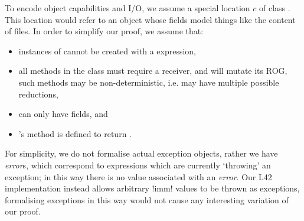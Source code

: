 \noindent To encode object capabilities and I/O, we assume a special location  $c$ of class \Q@Cap@. This location would refer to an object whose fields model things like the content of files. In order to simplify our proof, we assume that:
\SSI\begin{itemize}
	\item instances of \Q@Cap@ cannot be created with a \Q@new@ expression,
	\item all methods in the \Q@Cap@ class must require a \Q@mut@ receiver, and will mutate its ROG, such methods may be non-deterministic, i.e. may have multiple possible reductions,
	\item \Q@Cap@ can only have \Q@mut@ fields, and
	\item \Q@Cap@'s \Q@invariant@ method is defined to return \Q@true@.
\end{itemize}
For simplicity, we do not formalise actual exception objects, rather we have \emph{error}s, which correspond to expressions which are currently  `throwing' an exception; 
in this way there is no value associated with an \emph{error}.
Our L42 implementation instead allows arbitrary \Q!imm! values to be thrown as exceptions, formalising exceptions in this way would not cause any interesting variation of our proof.

